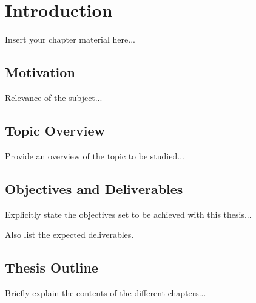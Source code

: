 
\chapter{Introduction}
\label{chapter:introduction}

Insert your chapter material here...

\section{Motivation}
\label{section:motivation}

Relevance of the subject...


\section{Topic Overview}
\label{section:overview}

Provide an overview of the topic to be studied...


\section{Objectives and Deliverables}
\label{section:objectives}

Explicitly state the objectives set to be achieved with this thesis...

Also list the expected deliverables.


\section{Thesis Outline}
\label{section:outline}

Briefly explain the contents of the different chapters...


